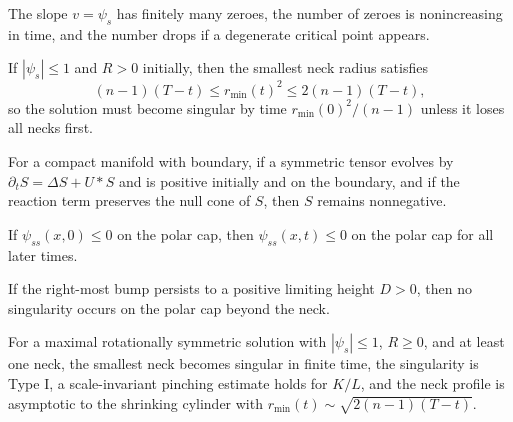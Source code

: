 \begin{lemma}
\label{ch02-lem-neckpinch-zeroes}
The slope \(v=\psi_s\) has finitely many zeroes, the number of zeroes is
nonincreasing in time, and the number drops if a degenerate critical point
appears.
\end{lemma}

\begin{lemma}
\label{ch02-lem-neckpinch-neck-rate}
If \(|\psi_s|\le 1\) and \(R>0\) initially, then the smallest neck radius
satisfies
\[
(n-1)(T-t)\le r_{\min}(t)^2\le 2(n-1)(T-t),
\]
so the solution must become singular by time \(r_{\min}(0)^2/(n-1)\) unless it
loses all necks first.
\end{lemma}

\begin{lemma}
\label{ch02-lem-tensor-maximum-boundary}
For a compact manifold with boundary, if a symmetric tensor evolves by
\(\partial_t S=\Delta S+U*S\) and is positive initially and on the boundary, and
if the reaction term preserves the null cone of \(S\), then \(S\) remains
nonnegative.
\end{lemma}

\begin{lemma}
\label{ch02-lem-neckpinch-concavity-polar-cap}
If \(\psi_{ss}(x,0)\le 0\) on the polar cap, then \(\psi_{ss}(x,t)\le 0\) on
the polar cap for all later times.
\end{lemma}

\begin{lemma}
\label{ch02-lem-neckpinch-no-polar-singularity}
If the right-most bump persists to a positive limiting height \(D>0\), then no
singularity occurs on the polar cap beyond the neck.
\end{lemma}

\begin{proposition}
\label{ch02-prop-neckpinch-typei-cylinder}
For a maximal rotationally symmetric solution with \(|\psi_s|\le 1\), \(R\ge 0\),
and at least one neck, the smallest neck becomes singular in finite time, the
singularity is Type I, a scale-invariant pinching estimate holds for \(K/L\),
and the neck profile is asymptotic to the shrinking cylinder with
\(r_{\min}(t)\sim \sqrt{2(n-1)(T-t)}\).
\end{proposition}

